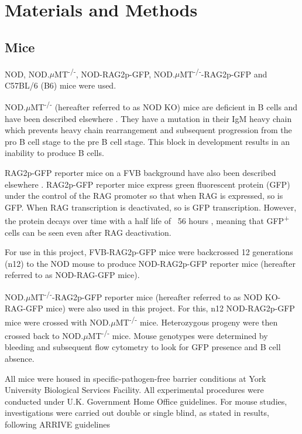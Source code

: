 
\chapter{Materials and Methods}



\section{Mice}
\label{methods:mice}

NOD, NOD.$\mu$MT\textsuperscript{-/-}, NOD-RAG2p-GFP, NOD.$\mu$MT\textsuperscript{-/-}-RAG2p-GFP and C57BL/6 (B6) mice were used.

NOD.$\mu$MT\textsuperscript{-/-} (hereafter referred to as NOD KO) mice are deficient in B cells and have been described elsewhere \citep{Serreze1996}.
They have a mutation in their IgM heavy chain which prevents heavy chain rearrangement and subsequent progression from the pro B cell stage to the pre B cell stage.
This block in development results in an inability to produce B cells.

RAG2p-GFP reporter mice on a FVB background have also been described elsewhere \citep{Yu1999}.
RAG2p-GFP reporter mice express green fluorescent protein (GFP) under the control of the RAG promoter so that when RAG is expressed, so is GFP.
When RAG transcription is deactivated, so is GFP transcription.
However, the protein decays over time with a half life of ~56 hours \citep{McCaughtry2007}, meaning that GFP\textsuperscript{+} cells can be seen even after RAG deactivation.

For use in this project, FVB-RAG2p-GFP mice were backcrossed 12 generations (n12) to the NOD mouse to produce NOD-RAG2p-GFP reporter mice (hereafter referred to as NOD-RAG-GFP mice).

NOD.$\mu$MT\textsuperscript{-/-}-RAG2p-GFP reporter mice (hereafter referred to as NOD KO-RAG-GFP mice) were also used in this project.
For this, n12 NOD-RAG2p-GFP mice were crossed with NOD.$\mu$MT\textsuperscript{-/-} mice.
Heterozygous progeny were then crossed back to NOD.$\mu$MT\textsuperscript{-/-} mice.
Mouse genotypes were determined by bleeding and subsequent flow cytometry to look for GFP presence and B cell absence.

All mice were housed in specific-pathogen-free barrier conditions at York University Biological Services Facility. 
All experimental procedures were conducted under U.K. Government Home Office guidelines.
For mouse studies, investigations were carried out double or single blind, as stated in results, following ARRIVE guidelines \citep{Arriveguidelines}





